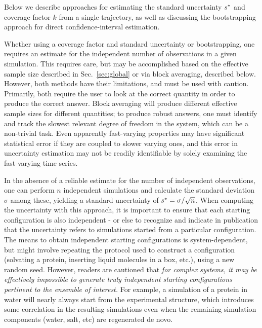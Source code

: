 
Below we describe approaches for estimating the standard uncertainty $s^*$ and coverage factor $k$ from a single trajectory, as well as discussing the bootstrapping approach for direct confidence-interval estimation.

Whether using a coverage factor and standard uncertainty or bootstrapping, one requires an estimate for the independent number of observations in a given simulation.  This requires care, but may be accomplished based on the effective sample size described in Sec.\ \ref{sec:global} or via block averaging, described below.  However, both methods have their limitations, and must be used with caution.  Primarily, both require the user to look at the correct quantity in order to produce the correct answer.  Block averaging will produce different effective sample sizes for different quantities; to produce robust answers, one must identify and track the slowest relevant degree of freedom in the system, which can be a non-trivial task.  Even apparently fast-varying properties may have significant statistical error if they are coupled to slower varying ones, and this error in uncertainty estimation may not be readily identifiable by solely examining the fast-varying time series.

In the absence of a reliable estimate for the number of independent observations, one can perform $n$ independent simulations and calculate the standard deviation $\sigma$ among these, yielding a standard uncertainty of $s^* = \sigma / \sqrt{n}$.  When computing the uncertainty with this approach, it is important to ensure that each starting configuration is also independent - or else to recognize and indicate in publication that the uncertainty refers to simulations started from a particular configuration.  The means to obtain independent starting configurations is system-dependent, but might involve repeating the protocol used to construct a configuration (solvating a protein, inserting liquid molecules in a box, etc.), using a new random seed.  However, readers are cautioned that \emph{for complex systems, it may be effectively impossible to generate truly independent starting configurations pertinent to the ensemble of interest.}  For example, a simulation of a protein in water will nearly always start from the experimental structure, which introduces some correlation in the resulting simulations even when the remaining simulation components (water, salt, etc) are regenerated de novo.

